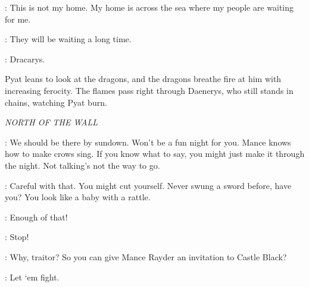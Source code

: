 \DAENERYS: This is not my home. My home is across the sea where my people are waiting for me. 

\PYAT: They will be waiting a long time. 


\DAENERYS:  Dracarys. 

\n Pyat leans to look at the dragons, and the dragons breathe fire at him with increasing ferocity. The flames pass right through Daenerys, who still stands in chains, watching Pyat burn.



\scene

\textit{NORTH OF THE WALL} 


\YGRITTE: We should be there by sundown. Won't be a fun night for you. Mance knows how to make crows sing. If you know what to say, you might just make it through the night.  Not talking's not the way to go. 


\JON: Careful with that. You might cut yourself. Never swung a sword before, have you? You look like a baby with a rattle. 


\HALFHAND: Enough of that! 


\JON: Stop! 

\HALFHAND:  Why, traitor? So you can give Mance Rayder an invitation to Castle Black? 


\LORDOFBONES: Let `em fight. 


